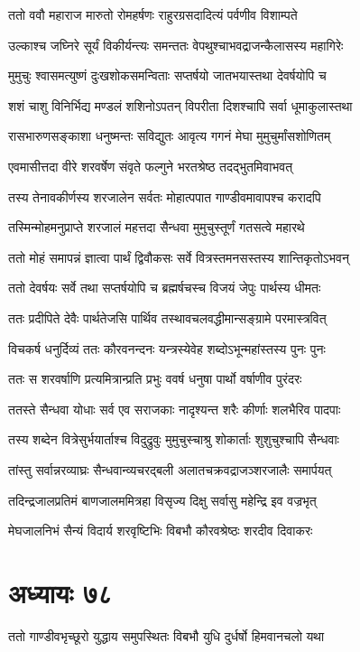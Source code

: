 \twolineshloka
{ततो ववौ महाराज मारुतो रोमहर्षणः}
{राहुरग्रसदादित्यं पर्वणीव विशाम्पते}


\twolineshloka
{उल्काश्च जघ्निरे सूर्यं विकीर्यन्त्यः समन्ततः}
{वेपथुश्चाभवद्राजन्कैलासस्य महागिरेः}


\twolineshloka
{मुमुचुः श्वासमत्युष्णं दुःखशोकसमन्विताः}
{सप्तर्षयो जातभयास्तथा देवर्षयोपि च}


\twolineshloka
{शशं चाशु विनिर्भिद्य मण्डलं शशिनोऽपतन्}
{विपरीता दिशश्चापि सर्वा धूमाकुलास्तथा}


\twolineshloka
{रासभारुणसङ्काशा धनुष्मन्तः सविद्युतः}
{आवृत्य गगनं मेघा मुमुचुर्मांसशोणितम्}


\twolineshloka
{एवमासीत्तदा वीरे शरवर्षेण संवृते}
{फल्गुने भरतश्रेष्ठ तदद्भुतमिवाभवत्}


\twolineshloka
{तस्य तेनावकीर्णस्य शरजालेन सर्वतः}
{मोहात्पपात गाण्डीवमावापश्च करादपि}


\twolineshloka
{तस्मिन्मोहमनुप्राप्ते शरजालं महत्तदा}
{सैन्धवा मुमुचुस्तूर्णं गतसत्वे महारथे}


\twolineshloka
{ततो मोहं समापन्नं ज्ञात्वा पार्थं द्विवौकसः}
{सर्वे वित्रस्तमनसस्तस्य शान्तिकृतोऽभवन्}


\twolineshloka
{ततो देवर्षयः सर्वे तथा सप्तर्षयोपि च}
{ब्रह्मर्षचस्च विजयं जेपुः पार्थस्य धीमतः}


\twolineshloka
{ततः प्रदीपिते देवैः पार्थतेजसि पार्थिव}
{तस्थावचलवद्धीमान्सङ्ग्रामे परमास्त्रवित्}


\twolineshloka
{विचकर्ष धनुर्दिव्यं ततः कौरवनन्दनः}
{यन्त्रस्येवेह शब्दोऽभून्महांस्तस्य पुनः पुनः}


\twolineshloka
{ततः स शरवर्षाणि प्रत्यमित्रान्प्रति प्रभुः}
{ववर्ष धनुषा पार्थो वर्षाणीव पुरंदरः}


\twolineshloka
{ततस्ते सैन्धवा योधाः सर्व एव सराजकाः}
{नादृश्यन्त शरैः कीर्णाः शलभैरिव पादपाः}


\twolineshloka
{तस्य शब्देन वित्रेसुर्भयार्ताश्च विदुद्रुवुः}
{मुमुचुस्चाश्रु शोकार्ताः शुशुचुश्चापि सैन्धवाः}


\twolineshloka
{तांस्तु सर्वान्नरव्याघ्रः सैन्धवान्व्यचरद्बली}
{अलातचक्रवद्राजञ्शरजालैः समार्पयत्}


\twolineshloka
{तदिन्द्रजालप्रतिमं बाणजालममित्रहा}
{विसृज्य दिक्षु सर्वासु महेन्द्रि इव वज्रभृत्}


\twolineshloka
{मेघजालनिभं सैन्यं विदार्य शरवृष्टिभिः}
{विबभौ कौरवश्रेष्ठः शरदीव दिवाकरः}


\chapter{अध्यायः ७८}
\twolineshloka
{ततो गाण्डीवभृच्छूरो युद्धाय समुपस्थितः}
{विबभौ युधि दुर्धर्षो हिमवानचलो यथा}


